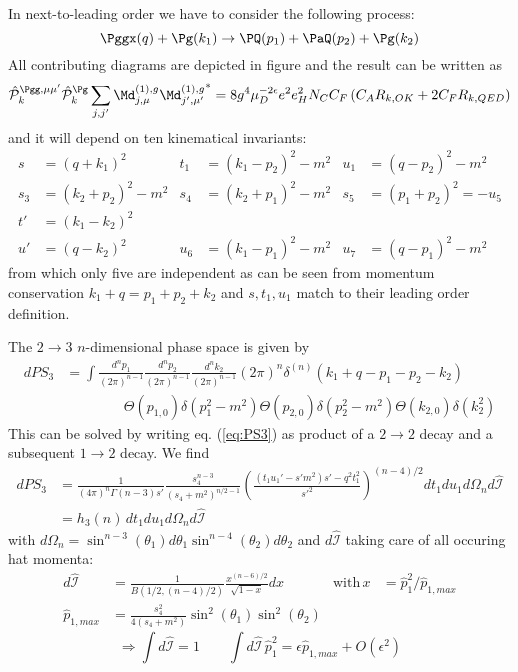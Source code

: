 \label{sec:NLO.g}
In next-to-leading order we have to consider the following process:
\begin{equation}
\Pggx(q) + \Pg(k_1) \rightarrow \PQ(p_1)+\PaQ(p_2) + \Pg(k_2)
\end{equation}
All contributing diagrams are depicted in figure  and the result can be written as
\begin{equation}
\hat {\mathcal P}_{k}^{\Pgg,\mu\mu'}\hat {\mathcal P}_{k}^{\Pg}\sum_{j,j'}{\Md^{(1),g}_{j,\mu}\Md^{(1),g}_{j',\mu'}}^* = 8g^4\mu_D^{-2\epsilon}e^2e_H^2 N_C C_F\left( C_A R_{k,OK} + 2C_F R_{k,QED}\right)
\end{equation}
and it will depend on ten kinematical invariants:
\begin{align}
s &= (q+k_1)^2 &t_1 &=(k_1-p_2)^2-m^2 &u_1 &=(q-p_2)^2 -m^2\\
s_3 &= (k_2+p_2)^2-m^2 &s_4 &=(k_2+p_1)^2-m^2 &s_5 &= (p_1+p_2)^2=-u_5\\
t' &= (k_1-k_2)^2\\
u' &= (q-k_2)^2 &u_6 &=(k_1-p_1)^2-m^2 &u_7 &=(q-p_1)^2-m^2
\end{align}
from which only five are independent as can be seen from momentum conservation $k_1+q=p_1+p_2+k_2$ and $s,t_1,u_1$ match to their leading order definition.

The $2\rightarrow 3$ $n$-dimensional phase space is given by
\begin{align}
dPS_3 &= \!\int\!\!\frac{d^{n}p_1}{(2\pi)^{n-1}}\frac{d^{n}p_2}{(2\pi)^{n-1}}\frac{d^{n}k_2}{(2\pi)^{n-1}}(2\pi)^n\delta^{(n)}(k_1+q-p_1-p_2-k_2) \nonumber\\
 &\hspace{50pt}\Theta(p_{1,0})\delta(p_1^2-m^2)\Theta(p_{2,0})\delta(p_2^2-m^2)\Theta(k_{2,0})\delta(k_2^2) \label{eq:PS3}
\end{align}
This can be solved by writing eq. (\ref{eq:PS3}) as product of a $2\rightarrow 2$ decay and a subsequent $1\rightarrow 2$ decay\cite{PhysRevD4054}. We find
\begin{align}
dPS_3 &= \frac 1 {(4\pi)^n\Gamma(n-3)s'} \frac{s_4^{n-3}}{(s_4+m^2)^{n/2-1}}\left(\frac{(t_1u_1'-s'm^2)s' - q^2t_1^2}{s'^2}\right)^{(n-4)/2}\! dt_1 du_1 d\Omega_n d\hat{\mathcal I}\\
 &=h_3(n)\,dt_1 du_1 d\Omega_n d\hat{\mathcal I}
\end{align}
with $d\Omega_n = \sin^{n-3}(\theta_1)d\theta_1\sin^{n-4}(\theta_2)d\theta_2$ and $d\hat{\mathcal I}$ taking care of all occuring hat momenta:
\begin{align}
d\hat{\mathcal I} &= \frac 1 {B(1/2,(n-4)/2)}\frac{x^{(n-6)/2}}{\sqrt{1-x}}dx &\text{with}\,x &= \hat p_1^2/\hat p_{1,max}\\
\hat p_{1,max} &= \frac{s_4^2}{4(s_4+m^2)}\sin^2(\theta_1)\sin^2(\theta_2)
\end{align}
\begin{equation}
\Rightarrow \int\!d\hat{\mathcal I} = 1 \qquad \int\!d\hat{\mathcal I}\,\hat p_1^2 = \epsilon \hat p_{1,max} + O(\epsilon^2)
\end{equation}

